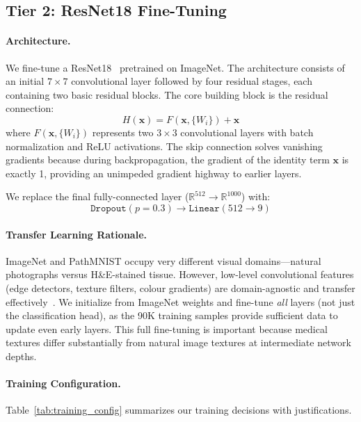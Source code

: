 \documentclass{article}
\begin{document}
\subsection{Tier 2: ResNet18 Fine-Tuning}
\label{sec:resnet}

\paragraph{Architecture.}
We fine-tune a ResNet18~\citep{he2016deep} pretrained on ImageNet. The architecture consists of an initial $7 \times 7$ convolutional layer followed by four residual stages, each containing two basic residual blocks. The core building block is the residual connection:
\begin{equation}
    H(\mathbf{x}) = F(\mathbf{x}, \{W_i\}) + \mathbf{x}
    \label{eq:residual}
\end{equation}
where $F(\mathbf{x}, \{W_i\})$ represents two $3 \times 3$ convolutional layers with batch normalization and ReLU activations. The skip connection solves vanishing gradients because during backpropagation, the gradient of the identity term $\mathbf{x}$ is exactly 1, providing an unimpeded gradient highway to earlier layers.

We replace the final fully-connected layer ($\mathbb{R}^{512} \to \mathbb{R}^{1000}$) with:
\begin{equation}
    \texttt{Dropout}(p\!=\!0.3) \to \texttt{Linear}(512 \to 9)
    \label{eq:head}
\end{equation}

\paragraph{Transfer Learning Rationale.}
ImageNet and PathMNIST occupy very different visual domains---natural photographs versus H\&E-stained tissue. However, low-level convolutional features (edge detectors, texture filters, colour gradients) are domain-agnostic and transfer effectively~\citep{yosinski2014transferable}. We initialize from ImageNet weights and fine-tune \emph{all} layers (not just the classification head), as the 90K training samples provide sufficient data to update even early layers. This full fine-tuning is important because medical textures differ substantially from natural image textures at intermediate network depths.

\paragraph{Training Configuration.}
Table~\ref{tab:training_config} summarizes our training decisions with justifications.
\end{document}
